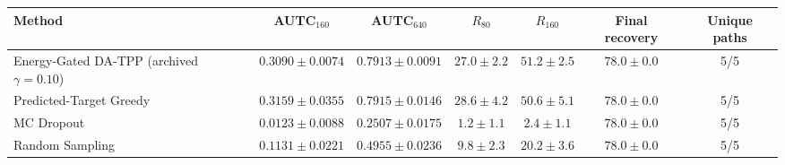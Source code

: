 \begin{tabular}{lcccccc}
\toprule
Method & AUTC$_{160}$ & AUTC$_{640}$ & $R_{80}$ & $R_{160}$ & Final recovery & Unique paths \\
\midrule
Energy-Gated DA-TPP (archived $\gamma=0.10$) & $0.3090 \pm 0.0074$ & $0.7913 \pm 0.0091$ & $27.0 \pm 2.2$ & $51.2 \pm 2.5$ & $78.0 \pm 0.0$ & 5/5 \\
Predicted-Target Greedy & $0.3159 \pm 0.0355$ & $0.7915 \pm 0.0146$ & $28.6 \pm 4.2$ & $50.6 \pm 5.1$ & $78.0 \pm 0.0$ & 5/5 \\
MC Dropout & $0.0123 \pm 0.0088$ & $0.2507 \pm 0.0175$ & $1.2 \pm 1.1$ & $2.4 \pm 1.1$ & $78.0 \pm 0.0$ & 5/5 \\
Random Sampling & $0.1131 \pm 0.0221$ & $0.4955 \pm 0.0236$ & $9.8 \pm 2.3$ & $20.2 \pm 3.6$ & $78.0 \pm 0.0$ & 5/5 \\
\bottomrule
\end{tabular}
